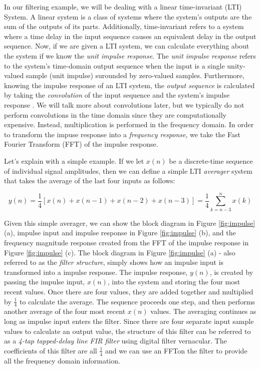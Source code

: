  In our filtering example, we will be dealing with a linear
 time-invariant (LTI) System. A linear system is a class of
 systems where the system's outputs are the sum of the outputs of
 its parts. Additionally, time-invariant refers to a system
 where a time delay in the input sequence causes an equivalent
 delay in the output sequence. Now, if we are given a LTI system,
 we can calculate everything about the system if we know the
 \textit{unit impulse response}. The \textit{unit impulse
 response} refers to the system's time-domain output sequence
 when the input is a single unity-valued sample (unit impulse)
 surounded by zero-valued samples. Furthermore, knowing the
 impulse response of an LTI system, the \textit{output sequence}
 is calculated by taking the \textit{convolution} of the input
 sequence and the system's impulse response \cite{lyons:intro}.
 We will talk more about convolutions later, but we typically do
 not perform convolutions in the time domain since they are
 computationally expensive. Instead, multiplication is performed
 in the frequency domain. In order to transform the impuse
 response into a \textit{frequency response}, we take the Fast
 Fourier Transform (FFT) of the impulse
 response\cite{lyons:intro}.

Let's explain with a simple example. If we let $x(n)$ be a
discrete-time sequence of individual signal amplitudes, then we
can define a simple LTI \textit{averager} system that takes the
average of the last four inputs as follows:

$$y(n) = \frac{1}{4} \left[ x(n)+x(n-1)+x(n-2)+x(n-3)\right] =  \frac{1}{4}\sum_{k=n-3}^{n} x(k)$$    

Given this simple averager, we can show the block diagram in
Figure \ref{fig:impulse} (a), impulse input and impulse response
in Figure \ref{fig:impulse} (b), and the frequency magnitude
response created from the FFT of the impulse response in Figure
\ref{fig:impulse} (c). The block diagram in Figure
\ref{fig:impulse} (a) - also referred to as the \textit{filter
structure}, simply shows how an impulse input is transformed into
a impulse response. The impulse response, $y(n)$, is created by
passing the impulse input, $x(n)$, into the system and storing
the four most recent values. Once there are four values, they are
added together and multiplied by $\frac{1}{4}$ to calculate the
average. The sequence proceeds one step, and then performs
another average of the four most recent $x(n)$ values. The
averaging continues as long as impulse input enters the filter.
Since there are four separate input sample values to calculate an
output value, the structure of this filter can be referred to as
a \textit{4-tap tapped-delay line FIR filter} using digital
filter vernacular. The coefficients of this filter are all
$\frac{1}{4}$ and we can use an FFTon the filter to provide all
the frequency domain information.

